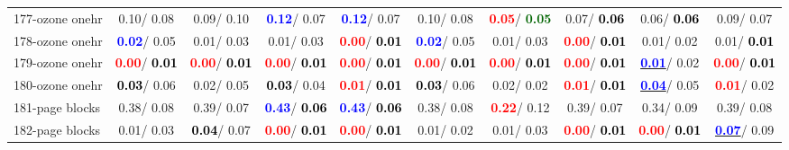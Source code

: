 \begin{table}[h]
\begin{center}
{\begin{tabular}{lc|c|c|c|c|c|c|c|c}
177-ozone onehr &   0.10/  0.08 &   0.09/  0.10 & \textcolor{blue}{\textbf{  0.12}}/  0.07 & \textcolor{blue}{\textbf{  0.12}}/  0.07 &   0.10/  0.08 & \textcolor{red}{\textbf{  0.05}}/\textcolor{darkgreen}{\textbf{  0.05}} &   0.07/\textcolor{black}{\textbf{  0.06}} &   0.06/\textcolor{black}{\textbf{  0.06}} &   0.09/  0.07 \\
178-ozone onehr & \textcolor{blue}{\textbf{  0.02}}/  0.05 &   0.01/  0.03 &   0.01/  0.03 & \textcolor{red}{\textbf{  0.00}}/\textcolor{black}{\textbf{  0.01}} & \textcolor{blue}{\textbf{  0.02}}/  0.05 &   0.01/  0.03 & \textcolor{red}{\textbf{  0.00}}/\textcolor{black}{\textbf{  0.01}} &   0.01/  0.02 &   0.01/\textcolor{black}{\textbf{  0.01}} \\
179-ozone onehr & \textcolor{red}{\textbf{  0.00}}/\textcolor{black}{\textbf{  0.01}} & \textcolor{red}{\textbf{  0.00}}/\textcolor{black}{\textbf{  0.01}} & \textcolor{red}{\textbf{  0.00}}/\textcolor{black}{\textbf{  0.01}} & \textcolor{red}{\textbf{  0.00}}/\textcolor{black}{\textbf{  0.01}} & \textcolor{red}{\textbf{  0.00}}/\textcolor{black}{\textbf{  0.01}} & \textcolor{red}{\textbf{  0.00}}/\textcolor{black}{\textbf{  0.01}} & \textcolor{red}{\textbf{  0.00}}/\textcolor{black}{\textbf{  0.01}} & \underline{\textcolor{blue}{\textbf{  0.01}}}/  0.02 & \textcolor{red}{\textbf{  0.00}}/\textcolor{black}{\textbf{  0.01}} \\
180-ozone onehr & \textcolor{black}{\textbf{  0.03}}/  0.06 &   0.02/  0.05 & \textcolor{black}{\textbf{  0.03}}/  0.04 & \textcolor{red}{\textbf{  0.01}}/\textcolor{black}{\textbf{  0.01}} & \textcolor{black}{\textbf{  0.03}}/  0.06 &   0.02/  0.02 & \textcolor{red}{\textbf{  0.01}}/\textcolor{black}{\textbf{  0.01}} & \underline{\textcolor{blue}{\textbf{  0.04}}}/  0.05 & \textcolor{red}{\textbf{  0.01}}/  0.02 \\
181-page blocks &   0.38/  0.08 &   0.39/  0.07 & \textcolor{blue}{\textbf{  0.43}}/\textcolor{black}{\textbf{  0.06}} & \textcolor{blue}{\textbf{  0.43}}/\textcolor{black}{\textbf{  0.06}} &   0.38/  0.08 & \textcolor{red}{\textbf{  0.22}}/  0.12 &   0.39/  0.07 &   0.34/  0.09 &   0.39/  0.08 \\ \hline
182-page blocks &   0.01/  0.03 & \textcolor{black}{\textbf{  0.04}}/  0.07 & \textcolor{red}{\textbf{  0.00}}/\textcolor{black}{\textbf{  0.01}} & \textcolor{red}{\textbf{  0.00}}/\textcolor{black}{\textbf{  0.01}} &   0.01/  0.02 &   0.01/  0.03 & \textcolor{red}{\textbf{  0.00}}/\textcolor{black}{\textbf{  0.01}} & \textcolor{red}{\textbf{  0.00}}/\textcolor{black}{\textbf{  0.01}} & \underline{\textcolor{blue}{\textbf{  0.07}}}/  0.09 \\

\end{tabular}}
\end{center}
\end{table}
